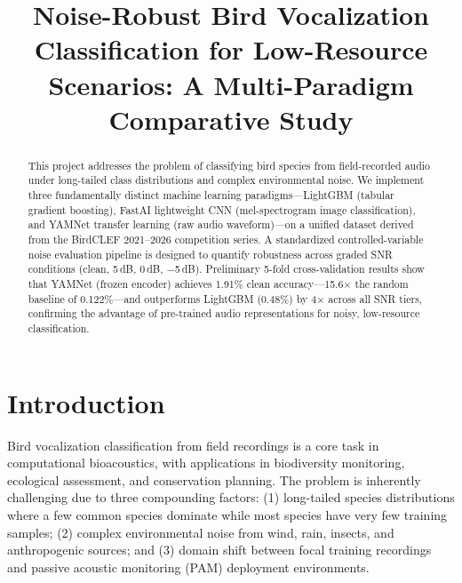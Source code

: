 \documentclass[conference]{IEEEtran}
\begin{document}
\title{Noise-Robust Bird Vocalization Classification for Low-Resource Scenarios: A Multi-Paradigm Comparative Study}

\author{
\and
{}
\and
{}
}

\maketitle
\begin{abstract}
This project addresses the problem of classifying bird species from field-recorded audio under long-tailed class distributions and complex environmental noise. We implement three fundamentally distinct machine learning paradigms---LightGBM (tabular gradient boosting), FastAI lightweight CNN (mel-spectrogram image classification), and YAMNet transfer learning (raw audio waveform)---on a unified dataset derived from the BirdCLEF 2021--2026 competition series. A standardized controlled-variable noise evaluation pipeline is designed to quantify robustness across graded SNR conditions (clean, 5\,dB, 0\,dB, $-$5\,dB). Preliminary 5-fold cross-validation results show that YAMNet (frozen encoder) achieves 1.91\% clean accuracy---15.6$\times$ the random baseline of 0.122\%---and outperforms LightGBM (0.48\%) by 4$\times$ across all SNR tiers, confirming the advantage of pre-trained audio representations for noisy, low-resource classification.
\end{abstract}

\section{Introduction}
Bird vocalization classification from field recordings is a core task in computational bioacoustics, with applications in biodiversity monitoring, ecological assessment, and conservation planning. The problem is inherently challenging due to three compounding factors: (1) long-tailed species distributions where a few common species dominate while most species have very few training samples; (2) complex environmental noise from wind, rain, insects, and anthropogenic sources; and (3) domain shift between focal training recordings and passive acoustic monitoring (PAM) deployment environments.
\end{document}
